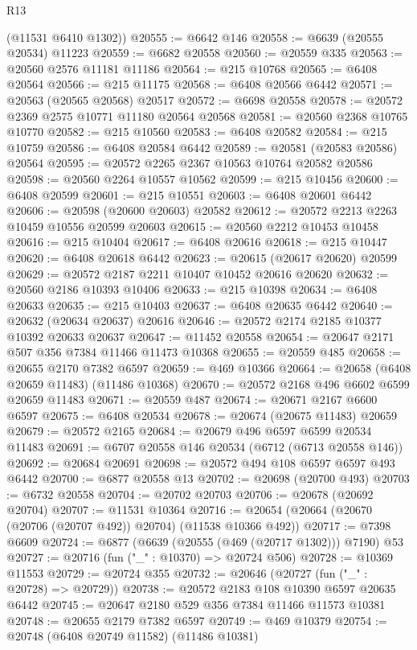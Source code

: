 \begin{lexlean}{R13}
\begin{coremodule}
      (@11531 @6410 @1302))
@20555 := @6642 @146
@20558 := @6639 (@20555 @20534) @11223
@20559 := @6682 @20558
@20560 := @20559 @335
@20563 := @20560 @2576 @11181 @11186
@20564 := @215 @10768
@20565 := @6408 @20564
@20566 := @215 @11175
@20568 := @6408 @20566 @6442
@20571 := @20563 (@20565 @20568) @20517
@20572 := @6698 @20558
@20578 := @20572 @2369 @2575 @10771 @11180 @20564 @20568
@20581 := @20560 @2368 @10765 @10770
@20582 := @215 @10560
@20583 := @6408 @20582
@20584 := @215 @10759
@20586 := @6408 @20584 @6442
@20589 := @20581 (@20583 @20586) @20564
@20595 := @20572 @2265 @2367 @10563 @10764 @20582 @20586
@20598 := @20560 @2264 @10557 @10562
@20599 := @215 @10456
@20600 := @6408 @20599
@20601 := @215 @10551
@20603 := @6408 @20601 @6442
@20606 := @20598 (@20600 @20603) @20582
@20612 := @20572 @2213 @2263 @10459 @10556 @20599 @20603
@20615 := @20560 @2212 @10453 @10458
@20616 := @215 @10404
@20617 := @6408 @20616
@20618 := @215 @10447
@20620 := @6408 @20618 @6442
@20623 := @20615 (@20617 @20620) @20599
@20629 := @20572 @2187 @2211 @10407 @10452 @20616 @20620
@20632 := @20560 @2186 @10393 @10406
@20633 := @215 @10398
@20634 := @6408 @20633
@20635 := @215 @10403
@20637 := @6408 @20635 @6442
@20640 := @20632 (@20634 @20637) @20616
@20646 := @20572 @2174 @2185 @10377 @10392 @20633 @20637
@20647 := @11452 @20558
@20654 := @20647 @2171 @507 @356 @7384 @11466 @11473 @10368
@20655 := @20559 @485
@20658 := @20655 @2170 @7382 @6597
@20659 := @469 @10366
@20664 := @20658 (@6408 @20659 @11483) (@11486 @10368)
@20670 := @20572 @2168 @496 @6602 @6599 @20659 @11483
@20671 := @20559 @487
@20674 := @20671 @2167 @6600 @6597
@20675 := @6408 @20534
@20678 := @20674 (@20675 @11483) @20659
@20679 := @20572 @2165
@20684 := @20679 @496 @6597 @6599 @20534 @11483
@20691 := @6707 @20558 @146 @20534 (@6712 (@6713 @20558 @146))
@20692 := @20684 @20691
@20698 := @20572 @494 @108 @6597 @6597 @493 @6442
@20700 := @6877 @20558 @13
@20702 := @20698 (@20700 @493)
@20703 := @6732 @20558
@20704 := @20702 @20703
@20706 := @20678 (@20692 @20704)
@20707 := @11531 @10364
@20716 := @20654 (@20664 (@20670 (@20706 (@20707 @492)) @20704) (@11538 @10366 @492))
@20717 := @7398 @6609
@20724 := @6877 (@6639 (@20555 (@469 (@20717 @1302))) @7190) @53
@20727 := @20716 (fun ("_" : @10370) => @20724 @506)
@20728 := @10369 @11553
@20729 := @20724 @355
@20732 := @20646 (@20727 (fun ("_" : @20728) => @20729))
@20738 := @20572 @2183 @108 @10390 @6597 @20635 @6442
@20745 := @20647 @2180 @529 @356 @7384 @11466 @11573 @10381
@20748 := @20655 @2179 @7382 @6597
@20749 := @469 @10379
@20754 := @20748 (@6408 @20749 @11582) (@11486 @10381)

\end{coremodule}
\end{lexlean}
